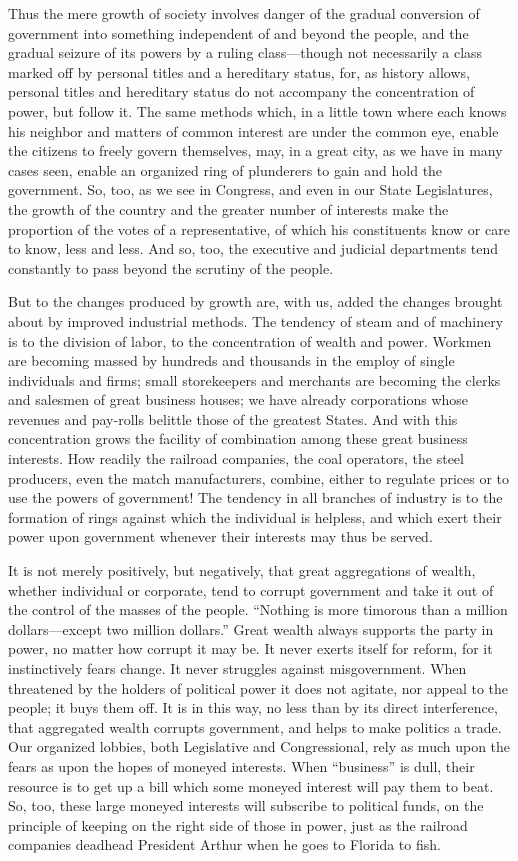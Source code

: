 \documentclass{book}
\begin{document}
Thus the mere growth of society involves danger of the gradual conversion of government into something independent of and beyond the people, and the gradual seizure of its powers by a ruling class—though not necessarily a class marked off by personal titles and a hereditary status, for, as history allows, personal titles and hereditary status do not accompany the concentration of power, but follow it. The same methods which, in a little town where each knows his neighbor and matters of common interest are under the common eye, enable the citizens to freely govern themselves, may, in a great city, as we have in many cases seen, enable an organized ring of plunderers to gain and hold the government. So, too, as we see in Congress, and even in our State Legislatures, the growth of the country and the greater number of interests make the proportion of the votes of a representative, of which his constituents know or care to know, less and less. And so, too, the executive and judicial departments tend constantly to pass beyond the scrutiny of the people.

But to the changes produced by growth are, with us, added the changes brought about by improved industrial methods. The tendency of steam and of machinery is to the division of labor, to the concentration of wealth and power. Workmen are becoming massed by hundreds and thousands in the employ of single individuals and firms; small storekeepers and merchants are becoming the clerks and salesmen of great business houses; we have already corporations whose revenues and pay-rolls belittle those of the greatest States. And with this concentration grows the facility of combination among these great business interests. How readily the railroad companies, the coal operators, the steel producers, even the match manufacturers, combine, either to regulate prices or to use the powers of government! The tendency in all branches of industry is to the formation of rings against which the individual is helpless, and which exert their power upon government whenever their interests may thus be served.

It is not merely positively, but negatively, that great aggregations of wealth, whether individual or corporate, tend to corrupt government and take it out of the control of the masses of the people. “Nothing is more timorous than a million dollars—except two million dollars.” Great wealth always supports the party in power, no matter how corrupt it may be. It never exerts itself for reform, for it instinctively fears change. It never struggles against misgovernment. When threatened by the holders of political power it does not agitate, nor appeal to the people; it buys them off. It is in this way, no less than by its direct interference, that aggregated wealth corrupts government, and helps to make politics a trade. Our organized lobbies, both Legislative and Congressional, rely as much upon the fears as upon the hopes of moneyed interests. When “business” is dull, their resource is to get up a bill which some moneyed interest will pay them to beat. So, too, these large moneyed interests will subscribe to political funds, on the principle of keeping on the right side of those in power, just as the railroad companies deadhead President Arthur when he goes to Florida to fish.
\end{document}
